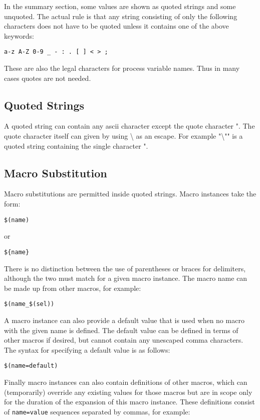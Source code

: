 In the summary section, some values are shown as quoted strings and some unquoted. The actual rule is that any string 
consisting of only the following characters does not have to be quoted unless it contains one of the above keywords:

\begin{verbatim}a-z A-Z 0-9 _ - : . [ ] < > ;
\end{verbatim}These are also the legal characters for process variable names. Thus in many cases quotes are not needed.

\subsection{Quoted Strings}

A quoted string can contain any ascii character except the quote character ". The quote character itself can given by using 
\textbackslash{} as an escape. For example "\textbackslash{}"" is a quoted string containing the single character ".

\subsection{Macro Substitution}

Macro substitutions are permitted inside quoted strings. Macro instances take the form:

\begin{verbatim}$(name)
\end{verbatim}or

\begin{verbatim}${name}
\end{verbatim}There is no distinction between the use of parentheses or braces for delimiters, although the two must match for a given 
macro instance. The macro name can be made up from other macros, for example:

\begin{verbatim}$(name_$(sel))
\end{verbatim}A macro instance can also provide a default value that is used when no macro with the given name is defined. The default 
value can be defined in terms of other macros if desired, but cannot contain any unescaped comma characters. The syntax 
for specifying a default value is as follows:

\begin{verbatim}$(name=default)
\end{verbatim}Finally macro instances can also contain definitions of other macros, which can (temporarily) override any existing values 
for those macros but are in scope only for the duration of the expansion of this macro instance. These definitions consist 
of \verb|name=value| sequences separated by commas, for example:

